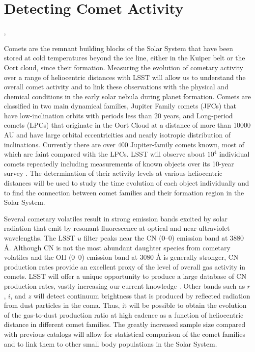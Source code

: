 %
%

\section{Detecting Comet Activity}
\def\secname{\chpname:activity}\label{sec:\secname}

,

Comets are the remnant building blocks of the Solar System
that have been stored at cold temperatures beyond the ice
line, either in the Kuiper belt or the Oort cloud, since their
formation.  Measuring the evolution of cometary activity over
a range of heliocentric distances with LSST will allow us to
understand the overall comet activity and to link these
observations with the physical and chemical conditions in the
early solar nebula during planet formation.  Comets are
classified in two main dynamical families, Jupiter Family
comets (JFCs) that have low-inclination orbits with periods
less than 20 years, and Long-period comets (LPCs) that
originate in the Oort Cloud at a distance of more than 10000
AU and have large orbital eccentricities and nearly isotropic
distribution of inclinations.  Currently there are over 400
Jupiter-family comets known, most of which are faint compared
with the LPCs.  LSST will observe about $10^4$ individual
comets repeatedly including measurements of known objects over
its 10-year survey \citep{2010PhDT.......241S}. The
determination of their activity levels at various heliocentric
distances will be used to study the time evolution of each
object individually and to find the connection between comet
families and their formation region in the Solar System.

Several cometary volatiles result in strong emission bands
excited by solar radiation that emit by resonant fluorescence
at optical and near-ultraviolet wavelengths.  The LSST $u$
filter peaks near the CN (0--0) emission band at 3880 \r{A}.
Although CN is not the most abundant daughter species from
cometary volatiles and the OH (0--0) emission band at 3080
\r{A} is generally stronger, CN production rates provide an
excellent proxy of the level of overall gas activity in
comets. LSST will offer a unique opportunity to produce
a large database of CN production rates, vastly increasing our current
knowledge \citep[see
e.g.][]{1995Icar..118..223A, 2012ApJ...758...29A}.
 Other bands such as $r$, $i$, and $z$ will detect
continuum brightness that is produced by reflected radiation
from dust particles in the coma. Thus, it will be possible to
obtain the evolution of the gas-to-dust production ratio at
high cadence as a function of heliocentric distance in
different comet families. The greatly increased sample size
compared with previous catalogs \citep{1995Icar..118..223A}
will allow for statistical comparison of the comet families
and to link them to other small body populations in the Solar
System.

